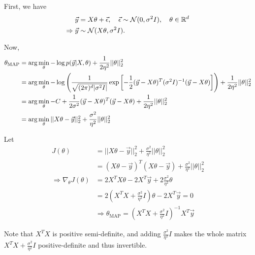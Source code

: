 \begin{answer}

First, we have
\begin{align*}
\vec{y} &= X\theta + \vec{\epsilon},
    \quad \vec{\epsilon} \sim \mathcal{N}(0, \sigma^2I),
    \quad \theta \in {\mathbb R}^{{d}} \\
\Rightarrow \vec{y} &\sim \mathcal{N}(X\theta, \sigma^2I).
\end{align*}

Now,
\begin{align*}
\theta_{\text{MAP}} &= \arg\min_\theta - \log p(\vec{y}|X, \theta) + \frac{1}{2 \eta^2} ||\theta||_2^2 \\
&= \arg\min_\theta -\log \left(\frac{1}{\sqrt{(2\pi)^{{d}} |\sigma^2I|}}\exp\left[-\frac{1}{2} (\vec{y} - X\theta)^T (\sigma^2 I)^{-1} (\vec{y} - X\theta) \right]\right) + \frac{1}{2 \eta^2}||\theta||_2^2 \\
&= \arg\min_\theta -C + \frac{1}{2 \sigma^2} (\vec{y} - X\theta)^T (\vec{y} - X\theta) + \frac{1}{2 \eta^2}||\theta||_2^2 \\
&= \arg\min_\theta ||X\theta - \vec{y}||_2^2 + \frac{\sigma^2}{\eta^2}||\theta||_2^2
\end{align*}

Let
\begin{align*}
J(\theta) &= ||X\theta - \vec{y}||_2^2 + \frac{\sigma^2}{\eta^2} ||\theta||_2^2 \\
&= (X\theta - \vec{y})^T(X\theta - \vec{y}) + \frac{\sigma^2}{\eta^2} ||\theta||_2^2 \\
\Rightarrow \nabla_\theta J(\theta) &= 2X^TX\theta - 2X^T\vec{y} + 2\frac{\sigma^2}{\eta^2} \theta \\
&= 2(X^TX + \frac{\sigma^2}{\eta^2}I)\theta - 2X^T\vec{y} = 0 \\
& \Rightarrow \boxed{\theta_\text{MAP} = \left(X^TX + \frac{\sigma^2}{\eta^2}I\right)^{-1} X^T\vec{y}}
\end{align*}

Note that $X^TX$ is positive semi-definite, and adding $\frac{\sigma^2}{\eta^2}I$ makes the whole matrix $X^TX + \frac{\sigma^2}{\eta^2}I$  positive-definite and thus invertible. 

\end{answer}
